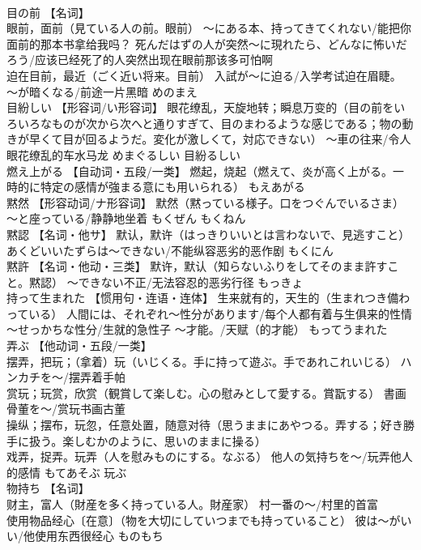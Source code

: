 \documentclass[8pt]{extreport}
\begin{document}
\begin{CJK}{UTF8}{min}
\\	目の前	【名词】 
\\	眼前，面前（見ている人の前。眼前） ～にある本、持ってきてくれない/能把你面前的那本书拿给我吗？ 死んだはずの人が突然～に現れたら、どんなに怖いだろう/应该已经死了的人突然出现在眼前那该多可怕啊 
\\	迫在目前，最近（ごく近い将来。目前） 入試が～に迫る/入学考试迫在眉睫。 ～が暗くなる/前途一片黑暗	めのまえ	
\\	目紛しい	【形容词/い形容词】 眼花缭乱，天旋地转；瞬息万变的（目の前をいろいろなものが次から次へと通りすぎて、目のまわるような感じである；物の動きが早くて目が回るようだ。変化が激しくて，対応できない） ～車の往来/令人眼花缭乱的车水马龙	めまぐるしい	目紛るしい
\\	燃え上がる	【自动词・五段/一类】 燃起，烧起（燃えて、炎が高く上がる。一時的に特定の感情が強まる意にも用いられる）	もえあがる	
\\	黙然	【形容动词/ナ形容词】 默然（黙っている様子。口をつぐんでいるさま） ～と座っている/静静地坐着	もくぜん もくねん	
\\	黙認	【名词・他サ】 默认，默许（はっきりいいとは言わないで、見逃すこと） あくどいいたずらは～できない/不能纵容恶劣的恶作剧	もくにん	
\\	黙許	【名词・他动・三类】 默许，默认（知らないふりをしてそのまま許すこと。黙認） ～できない不正/无法容忍的恶劣行径	もっきょ	
\\	持って生まれた	【惯用句・连语・连体】 生来就有的，天生的（生まれつき備わっている） 人間には、それぞれ～性分があります/每个人都有着与生俱来的性情 ～せっかちな性分/生就的急性子 ～才能。/天赋（的才能）	もってうまれた	
\\	弄ぶ	【他动词・五段/一类】 
\\	摆弄，把玩；（拿着）玩（いじくる。手に持って遊ぶ。手であれこれいじる） ハンカチを～/摆弄着手帕 
\\	赏玩；玩赏，欣赏（観賞して楽しむ。心の慰みとして愛する。賞翫する） 書画骨董を～/赏玩书画古董 
\\	操纵；摆布，玩忽，任意处置，随意对待（思うままにあやつる。弄する；好き勝手に扱う。楽しむかのように、思いのままに操る） 
\\	戏弄，捉弄。玩弄（人を慰みものにする。なぶる） 他人の気持ちを～/玩弄他人的感情	もてあそぶ	玩ぶ
\\	物持ち	【名词】 
\\	财主，富人（財産を多く持っている人。財産家） 村一番の～/村里的首富 
\\	使用物品经心〔在意〕（物を大切にしていつまでも持っていること） 彼は～がいい/他使用东西很经心	ものもち	

\end{CJK}
\end{document}

